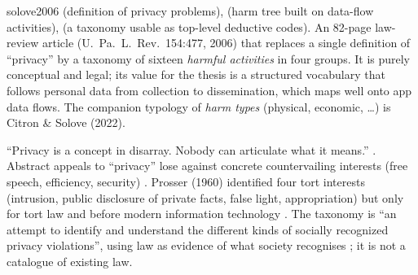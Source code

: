 \begin{papercard}{solove2006}
  (definition of privacy problems),  (harm tree built on data-flow activities),  (a taxonomy usable as top-level deductive codes). An 82-page law-review article (U.\ Pa.\ L.\ Rev.\ 154:477, 2006) that replaces a single definition of ``privacy'' by a taxonomy of sixteen \emph{harmful activities} in four groups. It is purely conceptual and legal; its value for the thesis is a structured vocabulary that follows personal data from collection to dissemination, which maps well onto app data flows. The companion typology of \emph{harm types} (physical, economic, \ldots) is Citron \& Solove (2022).

 ``Privacy is a concept in disarray. Nobody can articulate what it means.'' . Abstract appeals to ``privacy'' lose against concrete countervailing interests (free speech, efficiency, security) . Prosser (1960) identified four tort interests (intrusion, public disclosure of private facts, false light, appropriation) but only for tort law and before modern information technology . The taxonomy is ``an attempt to identify and understand the different kinds of socially recognized privacy violations'', using law as evidence of what society recognises ; it is not a catalogue of existing law.


\end{papercard}
